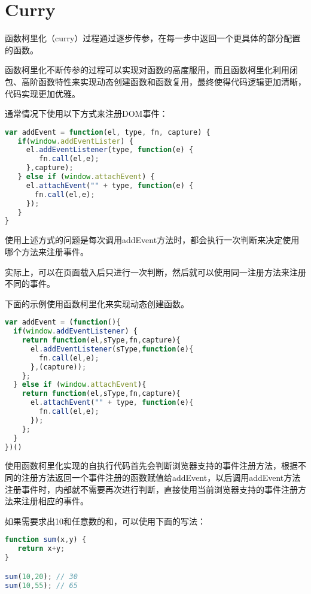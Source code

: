 \section{Curry}


函数柯里化（curry）过程通过逐步传参，在每一步中返回一个更具体的部分配置的函数。

函数柯里化不断传参的过程可以实现对函数的高度服用，而且函数柯里化利用闭包、高阶函数特性来实现动态创建函数和函数复用，最终使得代码逻辑更加清晰，代码实现更加优雅。






通常情况下使用以下方式来注册DOM事件：

\begin{lstlisting}[language=JavaScript]
var addEvent = function(el, type, fn, capture) {
   if(window.addEventLister) {
     el.addEventListener(type, function(e) {
        fn.call(el,e);
     },capture);
   } else if (window.attachEvent) {
     el.attachEvent("" + type, function(e) {
       fn.call(el,e);
     });
   }
}
\end{lstlisting}


使用上述方式的问题是每次调用addEvent方法时，都会执行一次判断来决定使用哪个方法来注册事件。

实际上，可以在页面载入后只进行一次判断，然后就可以使用同一注册方法来注册不同的事件。

下面的示例使用函数柯里化来实现动态创建函数。

\begin{lstlisting}[language=JavaScript]
var addEvent = (function(){
  if(window.addEventListener) {
    return function(el,sType,fn,capture){
      el.addEventListener(sType,function(e){
        fn.call(el,e);
      },(capture));
    };
  } else if (window.attachEvent){
    return function(el,sType,fn,capture){
      el.attachEvent("" + type, function(e){
        fn.call(el,e);
      });
    };
  }
})()
\end{lstlisting}

使用函数柯里化实现的自执行代码首先会判断浏览器支持的事件注册方法，根据不同的注册方法返回一个事件注册的函数赋值给addEvent，以后调用addEvent方法注册事件时，内部就不需要再次进行判断，直接使用当前浏览器支持的事件注册方法来注册相应的事件。

如果需要求出10和任意数的和，可以使用下面的写法：

\begin{lstlisting}[language=JavaScript]
function sum(x,y) {
   return x+y;
}

sum(10,20); // 30
sum(10,55); // 65
\end{lstlisting}

